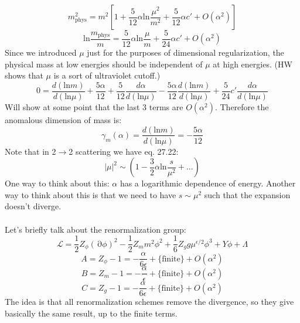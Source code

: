 \documentclass[12 pt]{article}
\DeclareMathOperator {\p} {\partial}
\begin{document}
\[            m_{\text{phys}}^2 = m^2 \left[          1 + \frac{5}{12} \alpha \text{ln} \frac{\mu^2}{m^2} + \frac{5}{12} \alpha c' + O(\alpha^2)     \right]               \]
\[          \text{ln} \frac{m_{\text{phys}}  }{m} = \frac{5}{12} \alpha \text{ln} \frac{\mu}{m} + \frac{5}{24} \alpha c' + O(\alpha^2)             \]
Since we introduced $\mu$ just for the purposes of dimensional regularization, the physical mass at low energies should be independent of $\mu$ at high energies. (HW shows that $\mu$ is a sort of ultraviolet cutoff.)
\[         0 = \frac{d (\text{ln} m)}{d (\text{ln} \mu)}   + \frac{5\alpha}{12}  +   \frac{5}{12} \frac{d \alpha}{d (\text{ln} \mu)} - \frac{5\alpha}{12} \frac{d (\text{ln} m)}{d (\text{ln} \mu)} + \frac{5}{24} c' \frac{d \alpha}{d (\text{ln} \mu)} \]
Will show at some point that the last 3 terms are $O(\alpha^2)$. Therefore the anomalous dimension of mass is:
\[         \gamma_m (\alpha) =   \frac{d (\text{ln} m)}{d (\text{ln} \mu)}  = - \frac{5\alpha}{12}    \]
Note that in 2$\to$2 scattering we have eq. 27.22:
\[           |\mu|^2 \sim \left(  1 - \frac{3}{2} \alpha \text{ln} \frac{s}{\mu^2} + ...   \right)         \]
One way to think about this: $\alpha$ has a logarithmic dependence of energy. Another way to think about this is that we need to have $s\sim \mu^2$ such that the expansion doesn't diverge.
\\
\\
Let's briefly talk about the renormalization group:
\[         \mathcal{L} = \frac{1}{2} Z_{\phi} (\p \phi)^2 - \frac{1}{2} Z_m m^2 \phi^2 + \frac{1}{6} Z_g g \mu^{\epsilon/2} \phi^3 + Y\phi + \Lambda       \]
\[         A = Z_{\phi}  - 1 = - \frac{\alpha}{6 \epsilon} + \{ \text{finite}\} + O(\alpha^2)        \]
\[         B = Z_{m}  - 1 = - \frac{\alpha}{\epsilon} + \{ \text{finite}\} + O(\alpha^2)        \]
\[         C = Z_{g}  - 1 = - \frac{\alpha}{6 \epsilon} + \{ \text{finite}\} + O(\alpha^2)        \]
The idea is that all renormalization schemes remove the divergence, so they give basically the same result, up to the finite terms.
\end{document}
